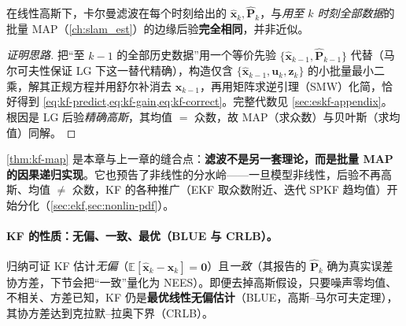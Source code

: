 \begin{theorem}\label{thm:kf-map}
在线性高斯下，卡尔曼滤波在每个时刻给出的 $\hat{\mathbf{x}}_k,\hat{\mathbf{P}}_k$，与\emph{用至 $k$ 时刻全部数据}的批量 MAP（\cref{ch:slam_est}）的边缘后验\textbf{完全相同}，并非近似。
\end{theorem}
\begin{proof}[证明思路]
把“至 $k-1$ 的全部历史数据”用一个等价先验 $\{\hat{\mathbf{x}}_{k-1},\hat{\mathbf{P}}_{k-1}\}$ 代替（马尔可夫性保证 LG 下这一替代精确），构造仅含 $\{\hat{\mathbf{x}}_{k-1},\mathbf{u}_k,\mathbf{z}_k\}$ 的小批量最小二乘，解其正规方程并用舒尔补消去 $\mathbf{x}_{k-1}$，再用矩阵求逆引理（SMW）化简，恰好得到 \cref{eq:kf-predict,eq:kf-gain,eq:kf-correct}。完整代数见 \cref{sec:eskf-appendix}。根因是 LG 后验\emph{精确高斯}，其均值 $=$ 众数，故 MAP（求众数）与贝叶斯（求均值）同解。
\end{proof}

\begin{insight}
\cref{thm:kf-map} 是本章与上一章的缝合点：\textbf{滤波不是另一套理论，而是批量 MAP 的因果递归实现}。它也预告了非线性的分水岭——一旦模型非线性，后验不再高斯、均值 $\neq$ 众数，KF 的各种推广（EKF 取众数附近、迭代 SPKF 趋均值）开始分化（\cref{sec:ekf,sec:nonlin-pdf}）。
\end{insight}

\paragraph{KF 的性质：无偏、一致、最优（BLUE 与 CRLB）。}
归纳可证 KF 估计\emph{无偏}（$\mathbb{E}[\hat{\mathbf{x}}_k-\mathbf{x}_k]=\mathbf{0}$）且\emph{一致}（其报告的 $\hat{\mathbf{P}}_k$ 确为真实误差协方差，下节会把“一致”量化为 NEES）。即便去掉高斯假设，只要噪声零均值、不相关、方差已知，KF 仍是\textbf{最优线性无偏估计}（BLUE，高斯–马尔可夫定理），其协方差达到克拉默–拉奥下界（CRLB）\cite{barfoot2024state}。

